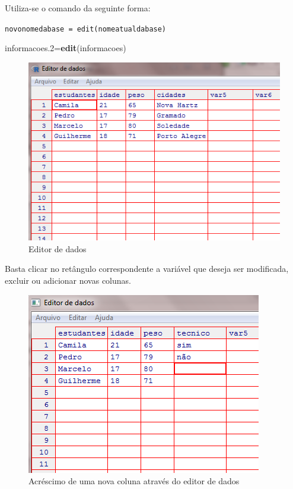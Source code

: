 \documentclass[12pt,portuguese,oneside]{book}
\newenvironment{Shaded}{\begin{snugshade}}{\end{snugshade}}
\newcommand{\KeywordTok}[1]{\textcolor[rgb]{0.13,0.29,0.53}{\textbf{#1}}}
\newcommand{\DecValTok}[1]{\textcolor[rgb]{0.00,0.00,0.81}{#1}}
\newcommand{\NormalTok}[1]{#1}
\begin{document}
Utiliza-se o comando da seguinte forma:

\texttt{novonomedabase\ =\ edit(nomeatualdabase)}

\begin{Shaded}
\begin{Highlighting}[]
\NormalTok{informacoes.}\DecValTok{2}\NormalTok{=}\KeywordTok{edit}\NormalTok{(informacoes)}
\end{Highlighting}
\end{Shaded}

\begin{figure}[H]

{\centering \includegraphics[width=0.8\linewidth]{95} 

}

\caption{Editor de dados}\label{fig:95}
\end{figure}

Basta clicar no retângulo correspondente a variável que deseja ser
modificada, excluir ou adicionar novas colunas.

\begin{figure}[H]

{\centering \includegraphics[width=0.8\linewidth]{10} 

}

\caption{Acréscimo de uma nova coluna através do editor de dados}\label{fig:10}
\end{figure}
\end{document}
